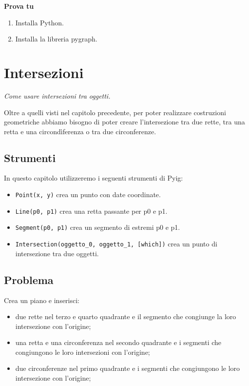 \textbf{Prova tu}
\begin{enumerate} [nosep]
\item Installa Python.
\item Installa la libreria pygraph.
\end{enumerate}



\section{Intersezioni}
\label{sec:intersezioni}

\emph{Come usare intersezioni tra oggetti.}

Oltre a quelli visti nel capitolo precedente, per poter realizzare costruzioni
geometriche abbiamo bisogno di poter creare l'intersezione tra due rette,
tra una retta e una circondìferenza o tra due circonferenze.


\subsection{Strumenti}

In questo capitolo utilizzeremo i seguenti strumenti di Pyig:

\begin{itemize} [noitemsep]
\item \texttt{Point(x, y)} crea un punto con date coordinate.
\item \texttt{Line(p0, p1)} crea una retta passante per p0 e p1.
\item \texttt{Segment(p0, p1)} crea un segmento di estremi p0 e p1.
\item \texttt{Intersection(oggetto\_0, oggetto\_1, {[}which{]})} crea un punto 
di intersezione tra due oggetti.
\end{itemize}


\subsection{Problema}

Crea un piano e inserisci:

\begin{itemize} [noitemsep]
\item due rette nel terzo e quarto quadrante
e il segmento che congiunge la loro intersezione con l'origine;
\item una retta e una circonferenza nel secondo quadrante 
e i segmenti che congiungono le loro intersezioni con l'origine;
\item due circonferenze nel primo quadrante 
e i segmenti che congiungono le loro intersezione con l'origine;
\end{itemize}


